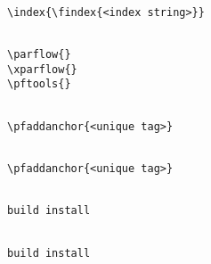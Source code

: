 {\newpage\clearpage
{}%
\begin{display}\begin{verbatim}

\index{\findex{<index string>}}\end{verbatim}
\end{display}%
\lthtmlfigureZ
\lthtmlcheckvsize\clearpage}

{\newpage\clearpage
{}%
\begin{display}\begin{verbatim}

\parflow{}
\xparflow{}
\pftools{}\end{verbatim}
\end{display}%
\lthtmlfigureZ
\lthtmlcheckvsize\clearpage}

{\newpage\clearpage
{}%
\begin{display}\begin{verbatim}

\pfaddanchor{<unique tag>}\end{verbatim}
\end{display}%
\lthtmlfigureZ
\lthtmlcheckvsize\clearpage}

{\newpage\clearpage
{}%
\begin{display}\begin{verbatim}

\pfaddanchor{<unique tag>}\end{verbatim}
\end{display}%
\lthtmlfigureZ
\lthtmlcheckvsize\clearpage}

{\newpage\clearpage
{}%
\begin{display}\begin{verbatim}

build install\end{verbatim}
\end{display}%
\lthtmlfigureZ
\lthtmlcheckvsize\clearpage}

{\newpage\clearpage
{}%
\begin{display}\begin{verbatim}

build install\end{verbatim}
\end{display}%
\lthtmlfigureZ
\lthtmlcheckvsize\clearpage}

